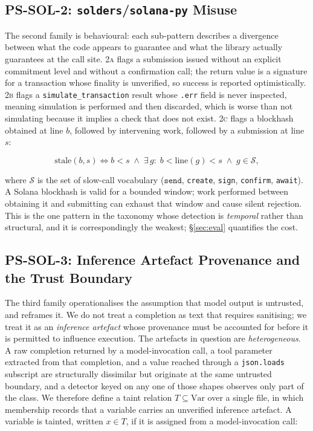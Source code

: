 \subsection{PS-SOL-2: \texttt{solders}/\texttt{solana-py} Misuse}

The second family is behavioural: each sub-pattern describes a divergence
between what the code appears to guarantee and what the library actually
guarantees at the call site. \textsc{2a} flags a submission issued without an
explicit commitment level and without a confirmation call; the return value is
a signature for a transaction whose finality is unverified, so success is
reported optimistically. \textsc{2b} flags a
\texttt{simulate\_transaction} result whose \texttt{.err} field is never
inspected, meaning simulation is performed and then discarded, which is worse
than not simulating because it implies a check that does not exist. \textsc{2c}
flags a blockhash obtained at line $b$, followed by intervening work, followed
by a submission at line $s$:

\begin{equation}
\mathrm{stale}(b,s) \iff b < s \;\wedge\; \exists\, g:\;
b < \mathrm{line}(g) < s \;\wedge\; g \in \mathcal{S},
\label{eq:stale}
\end{equation}

where $\mathcal{S}$ is the set of slow-call vocabulary ($\texttt{send}$,
\texttt{create}, \texttt{sign}, \texttt{confirm}, \texttt{await}). A Solana
blockhash is valid for a bounded window; work performed between obtaining it
and submitting can exhaust that window and cause silent rejection. This is the
one pattern in the taxonomy whose detection is \emph{temporal} rather than
structural, and it is correspondingly the weakest; \S\ref{sec:eval} quantifies
the cost.

\subsection{PS-SOL-3: Inference Artefact Provenance and the Trust Boundary}

The third family operationalises the assumption that model output is untrusted,
and reframes it. We do not treat a completion as text that requires sanitising;
we treat it as an \emph{inference artefact} whose provenance must be accounted
for before it is permitted to influence execution. The artefacts in question are
\emph{heterogeneous}. A raw completion returned by a model-invocation call, a
tool parameter extracted from that completion, and a value reached through a
\texttt{json.loads} subscript are structurally dissimilar but originate at the
same untrusted boundary, and a detector keyed on any one of those shapes
observes only part of the class. We therefore define a taint relation
$T \subseteq \mathrm{Var}$ over a single file, in which membership records that
a variable carries an unverified inference artefact. A variable is tainted,
written $x \in T$, if it is assigned from a model-invocation call:

